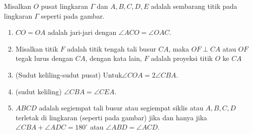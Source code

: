     
Misalkan $O$ pusat lingkaran $\Gamma$ dan $A,B,C,D,E$ adalah sembarang titik pada lingkaran $\Gamma$ seperti pada gambar.
\begin{enumerate}
    \item $CO=OA$ adalah jari-jari dengan $\angle ACO = \angle OAC$.
    \item Misalkan titik $F$ adalah titik tengah tali busur $CA$, maka $OF \perp CA$ atau $OF$ tegak lurus dengan $CA$, dengan kata lain, $F$ adalah proyeksi titik $O$ ke $CA$
    \item (Sudut keliling-sudut pusat) Untuk$\angle COA = 2\angle CBA$.
    \item (sudut keliling) $\angle CBA = \angle CEA$.
    \item $ABCD$ adalah segiempat tali busur atau segiempat siklis  atau $A,B,C,D$ terletak di lingkaran (seperti pada gambar) jika dan hanya jika $\angle CBA + \angle ADC = 180^\circ$ atau $\angle ABD = \angle ACD$.
\end{enumerate}

